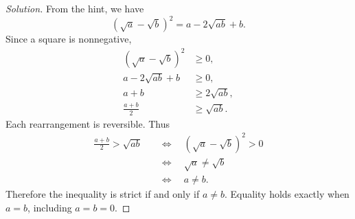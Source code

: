 \begin{proof}[Solution]
  From the hint, we have
  \[
    (\sqrt a-\sqrt b)^2=a-2\sqrt{ab}+b.
  \]
  Since a square is nonnegative,
  \begin{align*}
    (\sqrt a-\sqrt b)^2&\ge0,\\
    a-2\sqrt{ab}+b&\ge0,\\
    a+b&\ge2\sqrt{ab},\\
    \frac{a+b}{2}&\ge\sqrt{ab}.
  \end{align*}
  Each rearrangement is reversible. Thus
  \begin{align*}
    \frac{a+b}{2}>\sqrt{ab}\quad
      &\Longleftrightarrow\quad
        (\sqrt a-\sqrt b)^2>0\\
      &\Longleftrightarrow\quad \sqrt a\ne\sqrt b\\
      &\Longleftrightarrow\quad a\ne b.
  \end{align*}
  Therefore the inequality is strict if and only if $a\ne b$.
  Equality holds exactly when $a=b$, including $a=b=0$.
\end{proof}
